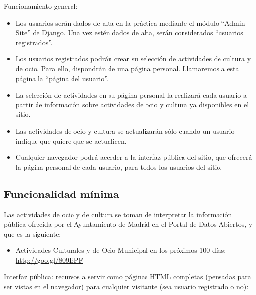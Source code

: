 Funcionamiento general:

\begin{itemize}
\item Los usuarios serán dados de alta en la práctica mediante el módulo ``Admin Site'' de Django. Una vez estén dados de alta, serán considerados ``usuarios registrados''.

\item Los usuarios registrados podrán crear su selección de actividades de cultura y de ocio. Para ello, dispondrán de una página personal. Llamaremos a esta página la ``página del usuario''.

\item La selección de actividades en su página personal la realizará cada usuario a partir de información sobre actividades de ocio y cultura ya disponibles en el sitio.

\item Las actividades de ocio y cultura se actualizarán sólo cuando un usuario indique que quiere que se actualicen.

\item Cualquier navegador podrá acceder a la interfaz pública del sitio, que ofrecerá la página personal de cada usuario, para todos los usuarios del sitio.

\end{itemize}


\subsection{Funcionalidad mínima}

Las actividades de ocio y de cultura se toman de interpretar la información pública ofrecida por el Ayuntamiento de Madrid en el Portal de Datos Abiertos, y que es la siguiente:
    \begin{itemize}
      \item Actividades Culturales y de Ocio Municipal en los próximos 100 días: \\
        \url{http://goo.gl/809BPF}
    \end{itemize}

Interfaz pública: recursos a servir como páginas HTML completas (pensadas para ser vistas en el navegador) para cualquier visitante (sea usuario registrado o no):

